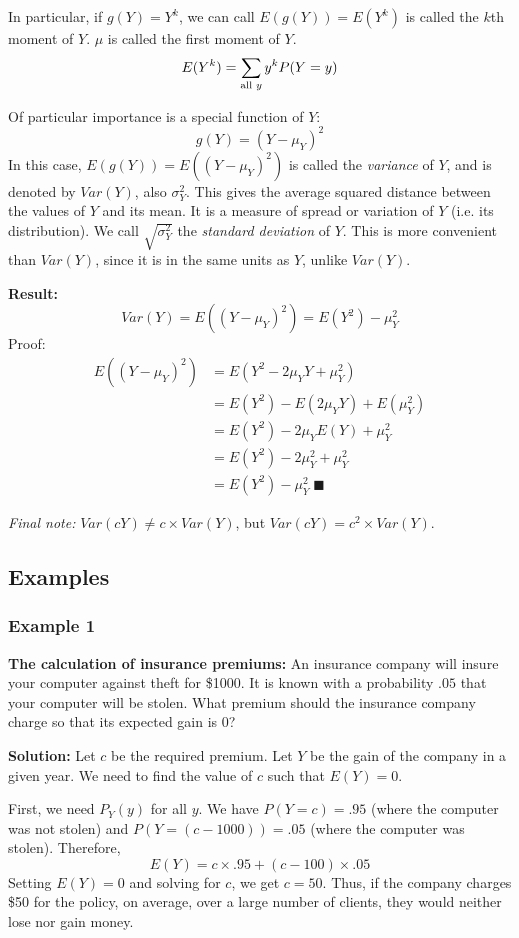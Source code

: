\documentclass[12pt]{article}
\begin{document}
In particular, if $g(Y) = Y^k$, we can call $E(g(Y)) = E(Y^k)$ is called the $k$th moment of $Y$. $\mu$ is called the first moment of $Y$.
\[
    E(Y^k) = \sum_{\textnormal{all } y} y^k P(Y=y)
\]

Of particular importance is a special function of $Y$:
\[
    g(Y) = (Y - \mu_Y)^2
\]
In this case, $E(g(Y)) = E ((Y - \mu_Y)^2)$ is called the \emph{variance} of $Y$, and is denoted by $Var(Y)$, also $\sigma_Y^2$. This gives the average squared distance between the values of $Y$ and its mean. It is a measure of spread or variation of $Y$ (i.e. its distribution). We call $\sqrt{\sigma_Y^2}$ the \emph{standard deviation} of $Y$. This is more convenient than $Var(Y)$, since it is in the same units as $Y$, unlike $Var(Y)$.

\textbf{Result:}
\[
    Var(Y) = E((Y - \mu_Y)^2) = E(Y^2) - \mu_Y^2
\]
Proof:
\begin{align*}
    E((Y-\mu_Y)^2) &= E(Y^2 - 2 \mu_Y Y + \mu_Y^2) \\
        &= E(Y^2) - E(2 \mu_Y Y) + E(\mu_Y^2) \\
        &= E(Y^2) - 2 \mu_Y E(Y) + \mu_Y^2 \\
        &= E(Y^2) - 2 \mu_Y^2 + \mu_Y^2 \\
        &= E(Y^2) - \mu_Y^2 \; \blacksquare
\end{align*}

\emph{Final note:} $Var(c Y) \neq c \times Var(Y)$, but $Var(c Y) = c^2 \times Var(Y)$.

\subsection{Examples}
\subsubsection{Example 1}
\textbf{The calculation of insurance premiums:} An insurance company will insure your computer against theft for \$1000. It is known with a probability $.05$ that your computer will be stolen. What premium should the insurance company charge so that its expected gain is 0?

\textbf{Solution:} Let $c$ be the required premium. Let $Y$ be the gain of the company in a given year. We need to find the value of $c$ such that $E(Y) = 0$.

First, we need $P_Y (y)$ for all $y$. We have $P(Y = c) = .95$ (where the computer was not stolen) and $P(Y = (c - 1000)) = .05$ (where the computer was stolen). Therefore,
\[
    E(Y) = c \times .95 + (c - 100) \times .05
\]
Setting $E(Y) = 0$ and solving for $c$, we get $c = 50$. Thus, if the company charges \$50 for the policy, on average, over a large number of clients, they would neither lose nor gain money.
\end{document}
